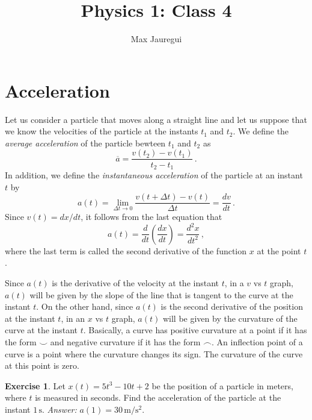 \documentclass[12pt,a4paper]{article}
\title{Physics 1: Class 4}
\author{Max Jauregui}
\newcommand{\dpar}[1]{\left(#1\right)}
\theoremstyle{definition}
\newtheorem{ex}{Exercise}[section]
\begin{document}
\maketitle

\section{Acceleration}

Let us consider a particle that moves along a straight line and let us
suppose that we know the velocities of the particle at the instants
$t_1$ and $t_2$. We define the \emph{average acceleration} of the
particle bewteen $t_1$ and $t_2$ as
$$\overline{a}=\frac{v(t_2)-v(t_1)}{t_2-t_1}\,.$$
In addition, we define the \emph{instantaneous acceleration} of the
particle at an instant $t$ by
$$a(t)=\lim_{\Delta t\to 0}\frac{v(t+\Delta t)-v(t)}{\Delta t}=\frac{dv}{dt}\,.$$
Since $v(t)=dx/dt$, it follows from the last equation that
$$a(t)=\frac{d}{dt}\dpar{\frac{dx}{dt}}=\frac{d^2x}{dt^2}\,,$$
where the last term is called the second derivative of the function
$x$ at the point $t$.

Since $a(t)$ is the derivative of the velocity at the instant $t$, in
a $v$ vs $t$ graph, $a(t)$ will be given by the slope of the line that
is tangent to the curve at the instant $t$. On the other hand, since
$a(t)$ is the second derivative of the position at the instant $t$, in
an $x$ vs $t$ graph, $a(t)$ will be given by the curvature of the
curve at the instant $t$. Basically, a curve has positive curvature at
a point if it has the form $\smile$ and negative curvature if it has
the form $\frown$. An inflection point of a curve is a point where the
curvature changes its sign. The curvature of the curve at this point
is zero.

\begin{ex}
  Let $x(t)=5t^3-10t+2$ be the position of a particle in meters, where
  $t$ is measured in seconds. Find the acceleration of the particle at
  the instant $1\,\mathrm{s}$. \emph{Answer:}
  $a(1)=30\,\mathrm{m/s^2}$.
\end{ex}
\end{document}
